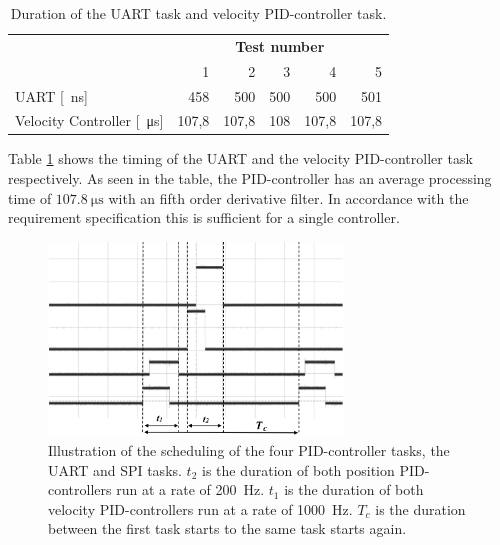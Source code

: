 \documentclass[../../main.tex]{subfiles}
\begin{document}
\begin{table}[H]
\centering
\begin{tabular}{lrrrrr}
\multicolumn{1}{c}{\textbf{}}            & \multicolumn{5}{c}{\textbf{Test number}}                                                                                                 \\
\multicolumn{1}{l|}{}                    & \multicolumn{1}{r|}{1}     & \multicolumn{1}{r|}{2}     & \multicolumn{1}{r|}{3}    & \multicolumn{1}{r|}{4}     & \multicolumn{1}{r}{5} \\ \hline
\multicolumn{1}{l|}{UART [\SI{}{\nano\second}]}                & \multicolumn{1}{r|}{458}   & \multicolumn{1}{r|}{500}   & \multicolumn{1}{r|}{500}  & \multicolumn{1}{r|}{500}   & 501                   \\
\multicolumn{1}{l|}{Velocity Controller [\SI{}{\micro\second}]} & \multicolumn{1}{r|}{107,8} & \multicolumn{1}{r|}{107,8} & \multicolumn{1}{r|}{108}  & \multicolumn{1}{r|}{107,8} & 107,8                
\end{tabular}
\caption{Duration of the  UART task and velocity PID-controller task.}
\label{tab:Task_Timing}
\end{table}

Table \ref{tab:Task_Timing} shows the timing of the UART and the velocity PID-controller task respectively. As seen in the table, the PID-controller has an average processing time of $\SI{107,8}{\micro \second}$ with an fifth order derivative filter. In accordance with the requirement specification this is sufficient for a single controller.
\begin{figure}
    \centering
    \includegraphics[width=0.7\textwidth]{Sections/Test/Images/TestMicrocontrollerTiming.png}
    \caption{Illustration of the scheduling of the four PID-controller tasks, the UART and SPI tasks. $t_2$ is the duration of both position PID-controllers run at a rate of \SI{200}{\hertz}. $t_1$ is the duration of both velocity PID-controllers run at a rate of \SI{1000}{\hertz}.  $T_c$ is the duration between the first task starts to the same task starts again. } 
    \label{fig:Schedueling_controllers}
\end{figure}
\end{document}
